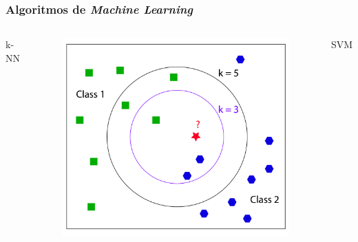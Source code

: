 \documentclass[mathserif]{beamer}
\begin{document}
\begin{frame}
\frametitle{Algoritmos de \textit{Machine Learning}}

\begin{columns}[t] %


\begin{center}k-NN\end{center}

\begin{figure}
\includegraphics[width=\textwidth]{../figures/knn.png}
\end{figure}

\pause


\begin{center}SVM\end{center}


\end{columns}
\end{frame}
\end{document}
